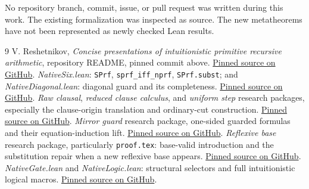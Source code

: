 \documentclass[11pt]{article}
\theoremstyle{definition}\newtheorem{definition}[theorem]{Definition}
\theoremstyle{remark}\newtheorem{remark}[theorem]{Remark}
\begin{document}
No repository branch, commit, issue, or pull request was written during this work. The existing formalization was inspected as source. The new metatheorems have not been represented as newly checked Lean results.

\begin{thebibliography}{9}
 V. Reshetnikov, \emph{Concise presentations of intuitionistic primitive recursive arithmetic}, repository README, pinned commit above.\newline
\href{https://github.com/VladimirReshetnikov/ProveIt/blob/443cff49563457a48ee0f663012d56c4bdb58fa0/Logic/PrimitiveRecursiveArithmetic/ConciseIPRA/README.md}{Pinned source on GitHub}.
 \emph{NativeSix.lean}: \texttt{SPrf}, \texttt{sprf\_iff\_nprf}, \texttt{SPrf.subst}; and \emph{NativeDiagonal.lean}: diagonal guard and its completeness.\newline
\href{https://github.com/VladimirReshetnikov/ProveIt/blob/443cff49563457a48ee0f663012d56c4bdb58fa0/Logic/PrimitiveRecursiveArithmetic/ConciseIPRA/Lean/ConciseIPRA/NativeSix.lean}{Pinned source on GitHub}.
 \emph{Raw clausal}, \emph{reduced clause calculus}, and \emph{uniform step} research packages, especially the clause-origin translation and ordinary-cut construction.\newline
\href{https://github.com/VladimirReshetnikov/ProveIt/tree/443cff49563457a48ee0f663012d56c4bdb58fa0/Logic/PrimitiveRecursiveArithmetic/ConciseIPRA/Research/raw_clausal}{Pinned source on GitHub}.
 \emph{Mirror guard} research package, one-sided guarded formulas and their equation-induction lift.\newline
\href{https://github.com/VladimirReshetnikov/ProveIt/tree/443cff49563457a48ee0f663012d56c4bdb58fa0/Logic/PrimitiveRecursiveArithmetic/ConciseIPRA/Research/mirror_guard}{Pinned source on GitHub}.
 \emph{Reflexive base} research package, particularly \texttt{proof.tex}: base-valid introduction and the substitution repair when a new reflexive base appears.\newline
\href{https://github.com/VladimirReshetnikov/ProveIt/tree/443cff49563457a48ee0f663012d56c4bdb58fa0/Logic/PrimitiveRecursiveArithmetic/ConciseIPRA/Research/reflexive_base}{Pinned source on GitHub}.
 \emph{NativeGate.lean} and \emph{NativeLogic.lean}: structural selectors and full intuitionistic logical macros.\newline
\href{https://github.com/VladimirReshetnikov/ProveIt/blob/443cff49563457a48ee0f663012d56c4bdb58fa0/Logic/PrimitiveRecursiveArithmetic/ConciseIPRA/Lean/ConciseIPRA/NativeLogic.lean}{Pinned source on GitHub}.

\end{thebibliography}
\end{document}
